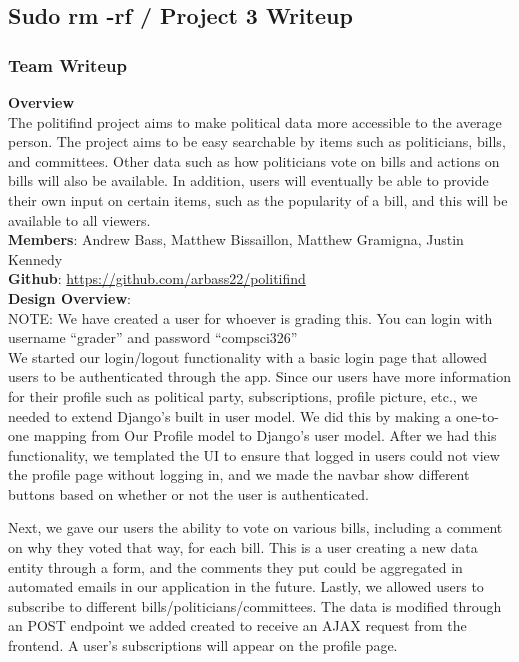 \documentclass{article}
\newcommand{\n}{\noindent}
\begin{document}
\begin{center}
\subsection*{Sudo rm -rf / Project 3 Writeup}
\end{center}

\subsubsection*{Team Writeup}

\textbf{Overview} \\

The politifind project aims to make political data more accessible to the average person. The project aims to be easy searchable by items such as politicians, bills, and committees. Other data such as how politicians vote on bills and actions on bills will also be available. In addition, users will eventually be able to provide their own input on certain items, such as the popularity of a bill, and this will be available to all viewers. \\

\n\textbf{Members}: Andrew Bass, Matthew Bissaillon, Matthew Gramigna, Justin Kennedy \\

\n\textbf{Github}: \url{https://github.com/arbass22/politifind} \\

\n\textbf{Design Overview}: \\

\n NOTE: We have created a user for whoever is grading this. You can login with username ``grader'' and password ``compsci326'' \\

We started our login/logout functionality with a basic login page that allowed users to be authenticated through the app. Since our users have more information for their profile such as political party, subscriptions, profile picture, etc., we needed to extend Django's built in user model. We did this by making a one-to-one mapping from Our Profile model to Django's user model. After we had this functionality, we templated the UI to ensure that logged in users could not view the profile page without logging in, and we made the navbar show different buttons based on whether or not the user is authenticated.

Next, we gave our users the ability to vote on various bills, including a comment on why they voted that way, for each bill. This is a user creating a new data entity through a form, and the comments they put could be aggregated in automated emails in our application in the future.  Lastly, we allowed users to subscribe to different bills/politicians/committees. The data is modified through an POST endpoint we added created to receive an AJAX request from the frontend.   A user's subscriptions will appear on the profile page.\\
\end{document}

